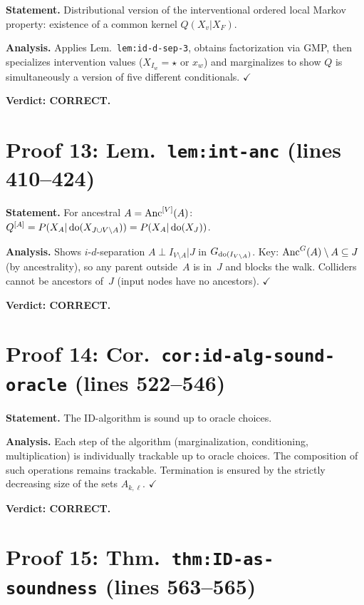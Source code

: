 \documentclass{article}
\begin{document}
\textbf{Statement.} Distributional version of the interventional ordered local
Markov property: existence of a common kernel $Q(X_v|X_F)$.

\textbf{Analysis.}
Applies Lem.\ \texttt{lem:id-d-sep-3}, obtains factorization via GMP,
then specializes intervention values ($X_{I_w}=\star$ or $x_w$) and
marginalizes to show $Q$ is simultaneously a version of five different
conditionals.  $\checkmark$

\textbf{Verdict: CORRECT.}

\section{Proof 13: Lem.\ \texttt{lem:int-anc} (lines 410--424)}

\textbf{Statement.} For ancestral $A=\mathrm{Anc}^{[V]}(A)$:
$Q^{[A]} = P(X_A|\operatorname{do}(X_{J\cup V\setminus A})) = P(X_A|\operatorname{do}(X_J))$.

\textbf{Analysis.}
Shows $i$-$d$-separation $A\perp I_{V\setminus A}|J$ in
$G_{\operatorname{do}(I_{V\setminus A})}$.  Key: $\mathrm{Anc}^G(A)\setminus A\subseteq J$
(by ancestrality), so any parent outside~$A$ is in~$J$ and blocks the walk.
Colliders cannot be ancestors of~$J$ (input nodes have no ancestors).
$\checkmark$

\textbf{Verdict: CORRECT.}

\section{Proof 14: Cor.\ \texttt{cor:id-alg-sound-oracle} (lines 522--546)}

\textbf{Statement.} The ID-algorithm is sound up to oracle choices.

\textbf{Analysis.}
Each step of the algorithm (marginalization, conditioning, multiplication)
is individually trackable up to oracle choices.  The composition of such
operations remains trackable.  Termination is ensured by the strictly
decreasing size of the sets $A_{k,\ell}$.  $\checkmark$

\textbf{Verdict: CORRECT.}

\section{Proof 15: Thm.\ \texttt{thm:ID-as-soundness} (lines 563--565)}
\end{document}
